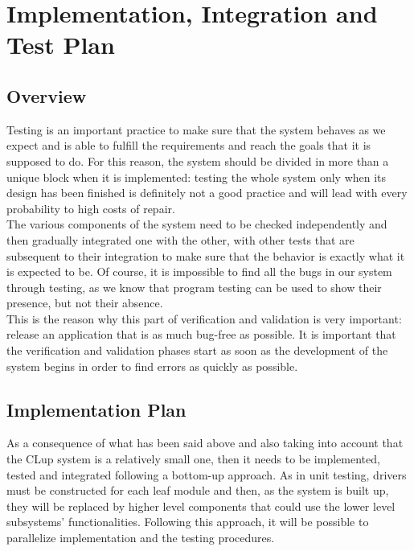 \documentclass[]{article}
\begin{document}
		
		\newpage
		
		\section{Implementation, Integration and Test Plan}
			 \bigskip
			 
			 \subsection{Overview}
			 \medskip
			 Testing is an important practice to make sure that the system behaves as we expect and is able to fulfill the requirements and reach the goals that it is supposed to do. For this reason, the system should be divided in more than a unique block when it is implemented: testing the whole system only when its design has been finished is definitely not a good practice and will lead with every probability to high costs of repair. \\The various components of the system need to be checked independently and then gradually integrated one with the other, with other tests that are subsequent to their integration to make sure that the behavior is exactly what it is expected to be. Of course, it is impossible to find all the bugs in our system through testing, as we know that program testing can be used to show their presence, but not their absence. \\This is the reason why this part of verification and validation is very important: release an application that is as much bug-free as possible. It is important that the verification and validation phases start as soon as the development of the system begins in order to find errors as quickly as possible.\newline\newline
			
			\subsection{Implementation Plan}
			\medskip
			As a consequence of what has been said above and also taking into account that the CLup system is a relatively small one, then it needs to be implemented, tested and integrated following a bottom-up approach. As in unit testing, drivers must be constructed for each leaf module and then, as the system is built up, they will be replaced by higher level components that could use the lower level subsystems’ functionalities. Following this approach, it will be possible to parallelize implementation and the testing procedures.\newline
\end{document}
